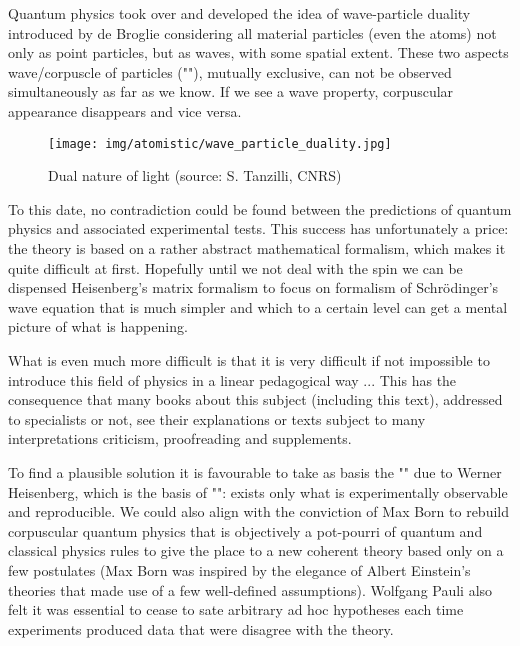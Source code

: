 	Quantum physics took over and developed the idea of wave-particle duality introduced by de Broglie considering all material particles (even the atoms) not only as point particles, but as waves, with some spatial extent. These two aspects wave/corpuscle of particles (""), mutually exclusive, can not be observed simultaneously as far as we know. If we see a wave property, corpuscular appearance disappears and vice versa.
	\begin{figure}[H]
		\centering
		\texttt{[image: img/atomistic/wave\_particle\_duality.jpg]}
		\caption[Dual nature of light]{Dual nature of light (source: S. Tanzilli, CNRS)}
	\end{figure}
	To this date, no contradiction could be found between the predictions of quantum physics and associated experimental tests. This success has unfortunately a price: the theory is based on a rather abstract mathematical formalism, which makes it quite difficult at first. Hopefully until we not deal with the spin we can be dispensed Heisenberg's matrix formalism to focus on formalism of Schrödinger's wave equation that is much simpler and which to a certain level can get a mental picture of what is happening.
	
	What is even much more difficult is that it is very difficult if not impossible to introduce this field of physics in a linear pedagogical way ... This has the consequence that many books about this subject (including this text), addressed to specialists or not, see their explanations or texts subject to many interpretations criticism, proofreading and supplements.
	
	To find a plausible solution it is favourable to take as basis the "" due to Werner Heisenberg, which is the basis of "": exists only what is experimentally observable and reproducible. We could also align with the conviction of Max Born to rebuild corpuscular quantum physics that is objectively a pot-pourri of quantum and classical physics rules to give the place to a new coherent theory based only on a few postulates (Max Born was inspired by the elegance of Albert Einstein's theories that made use of a few well-defined assumptions). Wolfgang Pauli also felt it was essential to cease to sate arbitrary ad hoc hypotheses each time experiments produced data that were disagree with the theory.
	
